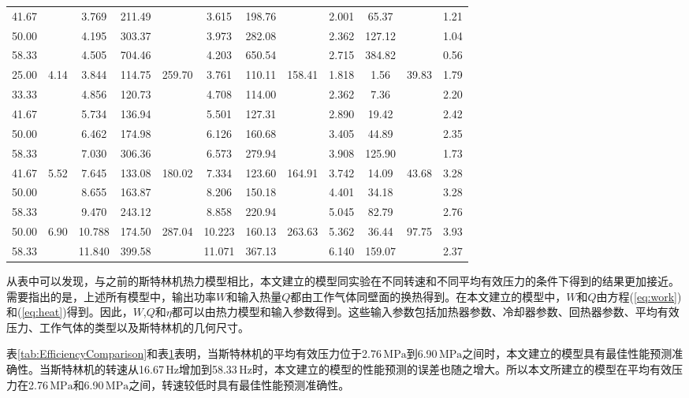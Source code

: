 \begin{table}
\begin{tabular}{cccccccccccc}
		41.67	&&3.769	&211.49	&&3.615	&198.76	&&2.001	&65.37	&&1.21\\
		50.00	&&4.195	&303.37	&&3.973	&282.08	&&2.362	&127.12	&&1.04\\
		58.33	&&4.505	&704.46	&&4.203	&650.54	&&2.715	&384.82	&&0.56\\
		\midrule
		25.00	&\multirow{5}{*}{4.14}	&3.844	&114.75	&\multirow{5}{*}{259.70}	&3.761	&110.11	&\multirow{5}{*}{158.41}	&1.818	&1.56	&\multirow{5}{*}{39.83}	&1.79\\
		33.33	&&4.856	&120.73	&&4.708	&114.00	&&2.362	&7.36	&&2.20\\
		41.67	&&5.734	&136.94	&&5.501	&127.31	&&2.890	&19.42	&&2.42\\
		50.00	&&6.462	&174.98	&&6.126	&160.68	&&3.405	&44.89	&&2.35\\
		58.33	&&7.030	&306.36	&&6.573	&279.94	&&3.908	&125.90	&&1.73\\
		\midrule
		41.67	&\multirow{3}{*}{5.52}	&7.645	&133.08	&\multirow{3}{*}{180.02}	&7.334	&123.60	&\multirow{3}{*}{164.91}	&3.742	&14.09	&\multirow{3}{*}{43.68}	&3.28\\
		50.00	&&8.655	&163.87	&&8.206	&150.18	&&4.401	&34.18	&&3.28\\
		58.33	&&9.470	&243.12	&&8.858	&220.94	&&5.045	&82.79	&&2.76\\
		\midrule
		50.00	&\multirow{2}{*}{6.90}	&10.788	&174.50	&\multirow{2}{*}{287.04}	&10.223	&160.13	&\multirow{2}{*}{263.63}	&5.362	&36.44	&\multirow{2}{*}{97.75}		&3.93\\
		58.33	&&11.840	&399.58	&&11.071	&367.13	&&6.140	&159.07	&&2.37\\
		\bottomrule
	\end{tabular}
	\label{tab:PowerComparison}
\end{table}

从表中可以发现，与之前的斯特林机热力模型相比，本文建立的模型同实验在不同转速和不同平均有效压力的条件下得到的结果更加接近。需要指出的是，上述所有模型中，输出功率$W$和输入热量$Q$都由工作气体同壁面的换热得到。在本文建立的模型中，$W$和$Q$由方程(\ref{eq:work})和(\ref{eq:heat})得到。因此，$W$,$Q$和$\eta$都可以由热力模型和输入参数得到。这些输入参数包括加热器参数、冷却器参数、回热器参数、平均有效压力、工作气体的类型以及斯特林机的几何尺寸。

表\ref{tab:EfficiencyComparison}和表\ref{tab:PowerComparison}表明，当斯特林机的平均有效压力位于2.76$\,\mathrm{MPa}$到6.90$\,\mathrm{MPa}$之间时，本文建立的模型具有最佳性能预测准确性。当斯特林机的转速从16.67$\,\mathrm{Hz}$增加到58.33$\,\mathrm{Hz}$时，本文建立的模型的性能预测的误差也随之增大。所以本文所建立的模型在平均有效压力在2.76$\,\mathrm{MPa}$和6.90$\,\mathrm{MPa}$之间，转速较低时具有最佳性能预测准确性。

